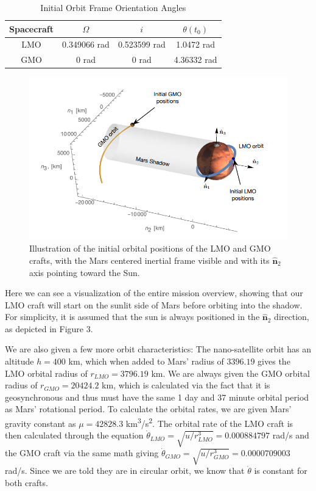 \documentclass[conf]{new-aiaa}
\begin{document}
\begin{table}[h]
\centering
\caption{Initial Orbit Frame Orientation Angles}
\begin{tabular}{|c|c|c|c|}
\hline
\textbf{Spacecraft} & \( \Omega \) & \( i \) & \( \theta(t_0) \) \\ \hline
LMO & 0.349066 rad & 0.523599 rad & 1.0472 rad \\ \hline
GMO & 0 rad & 0 rad & 4.36332 rad \\ \hline
\end{tabular}
\end{table}
\begin{figure}[H]
    \centering
    \captionsetup{width=.7\linewidth}
    \includegraphics[width=.75\linewidth]{fig3.PNG}
    \caption{Illustration of the initial orbital positions of the LMO and GMO crafts, with the Mars centered inertial frame visible and with its $\hat{\bm n}_2$ axis pointing toward the Sun.}
    \label{fig:enter-label}
\end{figure}
Here we can see a visualization of the entire mission overview, showing that our LMO craft will start on the sunlit side of Mars before orbiting into the shadow. For simplicity, it is assumed that the sun is always positioned in the \( \hat{\bm{n}}_2 \) direction, as depicted in Figure 3.

We are also given a few more orbit characteristics:
The nano-satellite orbit has an altitude $h=400$ km, which when added to Mars' radius of $3396.19$ gives the LMO orbital radius of $r_{LMO} = 3796.19$ km. We are always given the GMO orbital radius of $r_{GMO} = 20424.2$ km, which is calculated via the fact that it is geosynchronous and thus must have the same 1 day and 37 minute orbital period as Mars' rotational period. 
To calculate the orbital rates, we are given Mars' gravity constant as $\mu = 42828.3$ km\textsuperscript{3}/s\textsuperscript{2}. 
The orbital rate of the LMO craft is then calculated through the equation $\dot{\theta}_{LMO} = \sqrt{u/r_{LMO}^3} = 0.000884797$ rad/s and the GMO craft via the same math giving $\dot{\theta}_{GMO} = \sqrt{u/r_{GMO}^3} = 0.0000709003$ rad/s. Since we are told they are in circular orbit, we know that $\dot{\theta}$ is constant for both crafts.
\end{document}
